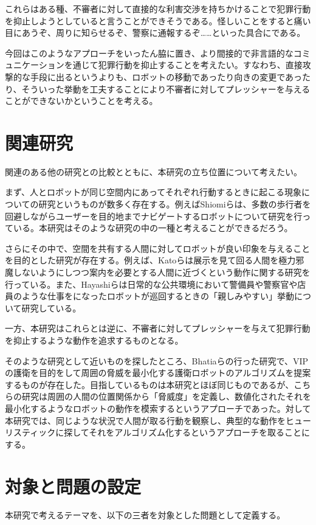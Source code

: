 \documentclass{kuisthesis}
\begin{document}
これらはある種、不審者に対して直接的な利害交渉を持ちかけることで犯罪行動を抑止しようとしていると言うことができそうである。怪しいことをすると痛い目にあうぞ、周りに知らせるぞ、警察に通報するぞ……といった具合にである。

今回はこのようなアプローチをいったん脇に置き、より間接的で非言語的なコミュニケーションを通じて犯罪行動を抑止することを考えたい。すなわち、直接攻撃的な手段に出るというよりも、ロボットの移動であったり向きの変更であったり、そういった挙動を工夫することにより不審者に対してプレッシャーを与えることができないかということを考える。


\section{関連研究}
関連のある他の研究との比較とともに、本研究の立ち位置について考えたい。

まず、人とロボットが同じ空間内にあってそれぞれ行動するときに起こる現象についての研究というものが数多く存在する。例えばShiomiらは、多数の歩行者を回避しながらユーザーを目的地までナビゲートするロボットについて研究を行っている\cite{1}。本研究はそのような研究の中の一種と考えることができるだろう。

さらにその中で、空間を共有する人間に対してロボットが良い印象を与えることを目的とした研究が存在する。例えば、Katoらは展示を見て回る人間を極力邪魔しないようにしつつ案内を必要とする人間に近づくという動作に関する研究\cite{2}を行っている。また、Hayashiらは日常的な公共環境において警備員や警察官や店員のような仕事をになったロボットが巡回するときの「親しみやすい」挙動について研究している\cite{3}。

一方、本研究はこれらとは逆に、不審者に対してプレッシャーを与えて犯罪行動を抑止するような動作を追求するものとなる。

そのような研究として近いものを探したところ、Bhatiaらの行った研究で、VIPの護衛を目的をして周囲の脅威を最小化する護衛ロボットのアルゴリズムを提案するもの\cite{4}が存在した。目指しているものは本研究とほぼ同じものであるが、こちらの研究は周囲の人間の位置関係から「脅威度」を定義し、数値化されたそれを最小化するようなロボットの動作を模索するというアプローチであった。対して本研究では、同じような状況で人間が取る行動を観察し、典型的な動作をヒューリスティックに探してそれをアルゴリズム化するというアプローチを取ることにする。

\section{対象と問題の設定}
本研究で考えるテーマを、以下の三者を対象とした問題として定義する。
\end{document}
